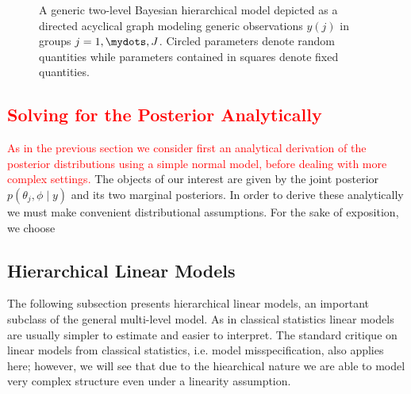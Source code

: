\begin{figure}[ht]
\begin{center}
\end{center}
\label{fig:group_sem}
\caption{A generic two-level Bayesian hierarchical model depicted as a directed acyclical graph modeling generic observations $y(j)$ in groups $j = 1,\mydots, J$. Circled parameters denote random quantities while parameters contained in squares denote fixed quantities.}
\end{figure}

\subsection{\textcolor{red}{Solving for the Posterior Analytically}}
\textcolor{red}{
As in the previous section we consider first an analytical derivation of the posterior distributions using a simple normal model, before dealing with more complex settings.
}
The objects of our interest are given by the joint posterior $p(\theta_j, \phi \mid y)$
and its two marginal posteriors. In order to derive these analytically we must
make convenient distributional assumptions. For the sake of exposition, we choose

\subsection{Hierarchical Linear Models}
The following subsection presents hierarchical linear models, an important subclass of the general multi-level model.
As in classical statistics linear models are usually simpler to estimate and easier to interpret.
The standard critique on linear models from classical statistics, i.e. model misspecification, also applies here; however, we will see that due to the hiearchical nature we are able to model very complex structure even under a linearity assumption.

